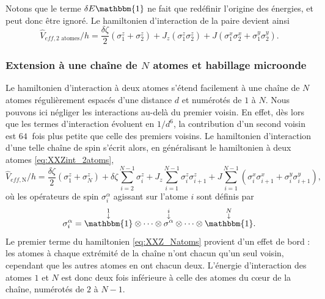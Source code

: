 %
Notons que le terme $\delta E \mathbbm{1}$ ne fait que redéfinir l'origine des énergies, et peut donc être ignoré.
Le hamiltonien d'interaction de la paire devient ainsi
\begin{equation}
\label{eq:XXZint_2atoms}
\hat{V}_{eff,\text{2 atomes}}/h = \frac{\delta\zeta}{2}\left( \sigma_1^z + \sigma_2^z \right)
+ J_z\left( \sigma_1^z \sigma_2^z \right)
+ J \left( \sigma_1^x \sigma_2^x + \sigma_1^y \sigma_2^y \right).
\end{equation}

	\subsubsection*{Extension à une chaîne de $N$ atomes et habillage microonde}
\noindent Le hamiltonien d'interaction à deux atomes s'étend facilement à une chaîne de $N$ atomes régulièrement espacés d'une distance $d$ et numérotés de $1$ à $N$.
Nous pouvons ici négliger les interactions au-delà du premier voisin.
En effet, dès lors que les termes d'interaction évoluent en $1/d^6$, la contribution d'un second voisin est $\SI{64}{}$ fois plus petite que celle des premiers voisins.
Le hamiltonien d'interaction d'une telle chaîne de spin s'écrit alors, en généralisant le hamiltonien à deux atomes \eqref{eq:XXZint_2atoms},
%
\begin{equation}
\label{eq:XXZint_Natoms}
\hat{V}_{eff,\text{N}}/h =
\frac{\delta\zeta}{2} \left( \sigma_1^z + \sigma_N^z \right)
+ \delta\zeta \sum_{i=2}^{N-1} \sigma_i^z
+ J_z \sum_{i=1}^{N-1} \sigma_i^z \sigma_{i+1}^z
+ J \sum_{i=1}^{N-1} \left( \sigma_i^x \sigma_{i+1}^x + \sigma_i^y \sigma_{i+1}^y \right) ,
\end{equation}
%
où les opérateurs de spin $\sigma_i^\alpha$ agissant sur l'atome $i$ sont définis par
%
\begin{equation}
\label{eq:Pauli_Natoms}
\sigma_i^\alpha = \overset{\substack{1\\ \downarrow \\}}{\mathbbm{1}}
\otimes\dots\otimes \overset{\substack{i\\ \downarrow \\}}{\sigma^\alpha}
\otimes\dots\otimes \overset{\substack{N\\ \downarrow \\}}{\mathbbm{1}}.
\end{equation}
%
Le premier terme du hamiltonien \eqref{eq:XXZ_Natoms} provient d'un effet de bord :
les atomes à chaque extrémité de la chaîne n'ont chacun qu'un seul voisin, cependant que les autres atomes en ont chacun deux.
L'énergie d'interaction des atomes $1$ et $N$ est donc deux fois inférieure à celle des atomes du \og c\oe ur \fg{} de la chaîne, numérotés de $2$ à $N-1$.

